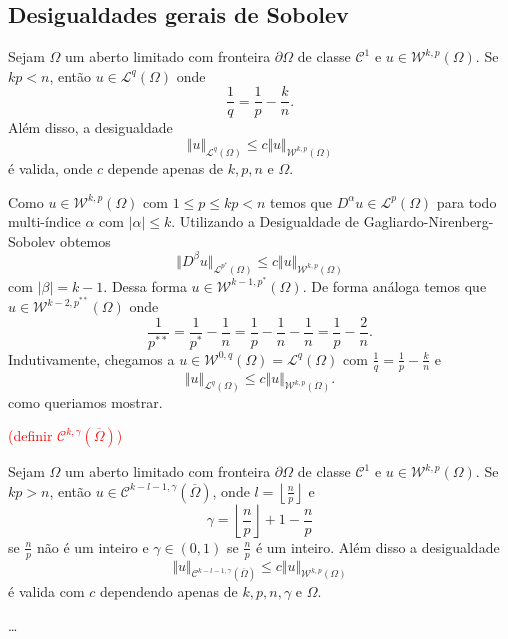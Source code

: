 \documentclass[a4paper, 11pt]{book}
\theoremstyle{definition}
\newcommand{\cC}{\mathcal{C}}
\newcommand{\cL}{\mathcal{L}}
\newcommand{\cW}{\mathcal{W}}
\begin{document}
\subsection{Desigualdades gerais de Sobolev}

\begin{tbox}
    Sejam $\Omega$ um aberto limitado com fronteira $\partial\Omega$ de classe $\cC^1$ e $u \in \cW^{k,p}(\Omega)$.
    Se $kp < n$, então $u \in \cL^q(\Omega)$ onde
    \[
        \frac{1}{q} = \frac{1}{p} - \frac{k}{n}.
    \]
    Além disso, a desigualdade
    \[
        \Vert u \Vert_{\cL^q(\Omega)} \leqslant c \Vert u \Vert_{\cW^{k,p}(\Omega)}
    \]
    é valida, onde $c$ depende apenas de $k, p, n$ e $\Omega$.
\end{tbox}
\begin{prf}
    Como $u \in \cW^{k,p}(\Omega)$ com $1 \leqslant p \leqslant kp < n$ temos que $D^\alpha u \in \cL^p(\Omega)$ para todo multi-índice $\alpha$ com $|\alpha| \leqslant k$.
    Utilizando a Desigualdade de Gagliardo-Nirenberg-Sobolev obtemos
    \[
        \Vert D^\beta u \Vert_{\cL^{p^*}(\Omega)} \leqslant c \Vert u \Vert_{\cW^{k,p}(\Omega)}
    \]
    com $|\beta| = k-1$.
    Dessa forma $u \in \cW^{k-1,p^*}(\Omega)$.
    De forma análoga temos que $u \in \cW^{k-2,p^{**}}(\Omega)$ onde
    \[
        \frac{1}{p^{**}} = \frac{1}{p^*} - \frac{1}{n} = \frac{1}{p} - \frac{1}{n} - \frac{1}{n} = \frac{1}{p} - \frac{2}{n}.
    \]
    Indutivamente, chegamos a $u \in \cW^{0,q}(\Omega) = \cL^q(\Omega)$ com $\frac{1}{q} = \frac{1}{p} - \frac{k}{n}$ e
    \[
        \Vert u \Vert_{\cL^q(\Omega)} \leqslant c \Vert u \Vert_{\cW^{k,p}(\Omega)}.
    \]
    como queriamos mostrar.
\end{prf}

\textcolor{red}{(definir $\cC^{k,\gamma}(\overline\Omega)$)}

\begin{tbox}
    Sejam $\Omega$ um aberto limitado com fronteira $\partial\Omega$ de classe $\cC^1$ e $u \in \cW^{k,p}(\Omega)$. 
    Se $kp > n$, então $u \in \cC^{k - l - 1,\gamma}(\overline\Omega)$, onde $l = \left\lfloor \frac{n}{p} \right\rfloor$ e
    \[
        \gamma = \left\lfloor \frac{n}{p} \right\rfloor + 1 - \frac{n}{p}
    \]
    se $\frac{n}{p}$ não é um inteiro e $\gamma \in (0,1)$ se $\frac{n}{p}$ é um inteiro.
    Além disso a desigualdade
    \[
        \Vert u \Vert_{\cC^{k - l - 1,\gamma}(\overline\Omega)} \leqslant c \Vert u \Vert_{\cW^{k,p}(\Omega)}
    \]
    é valida com $c$ dependendo apenas de $k, p, n, \gamma$ e $\Omega$.
\end{tbox}
\begin{prf}
    \dots
\end{prf}
\end{document}
